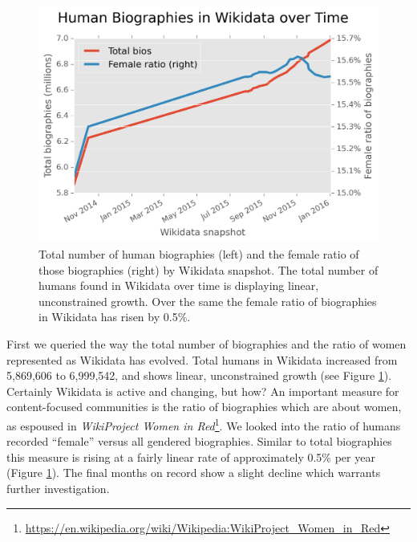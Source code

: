 \documentclass{sig-alternate-05-2015}
\begin{document}
\begin{figure}
\includegraphics[width=\columnwidth]{figures/totalfrb.png} 
\caption{Total number of human biographies (left) and the female ratio of those biographies (right) by Wikidata snapshot. The total number of humans found in Wikidata over time is displaying linear, unconstrained growth. Over the same  the female ratio of biographies in Wikidata has risen by 0.5\%.}
\label{fig:totalfrb}
\end{figure}

First we queried the way the total number of biographies and the ratio of women represented as Wikidata has evolved. Total humans in Wikidata increased from 5,869,606 to 6,999,542, and shows linear, unconstrained growth (see Figure \ref{fig:totalfrb}). Certainly Wikidata is active and changing, but how? An important measure for content-focused communities is the ratio of biographies which are about women, as espoused in \textit{WikiProject Women in Red}\footnote{\url{https://en.wikipedia.org/wiki/Wikipedia:WikiProject_Women_in_Red}}. We looked into the ratio of  humans recorded ``female'' versus all gendered biographies. Similar to total biographies this measure is rising at a fairly linear rate of approximately 0.5\% per year (Figure \ref{fig:totalfrb}). The final months on record show a slight decline which warrants further investigation. 
\end{document}
